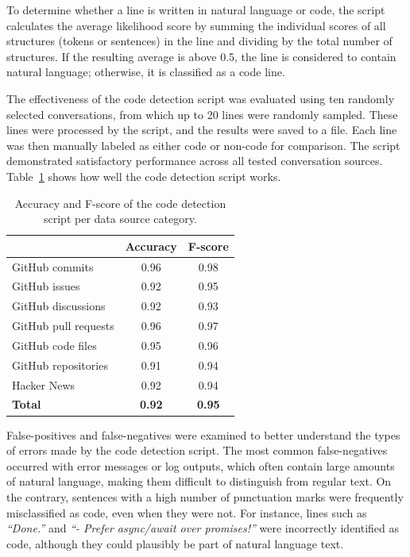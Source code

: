 To determine whether a line is written in natural language or code, the script calculates the average likelihood score by summing the individual scores of all structures (tokens or sentences) in the line and dividing by the total number of structures. If the resulting average is above 0.5, the line is considered to contain natural language; otherwise, it is classified as a code line.

The effectiveness of the code detection script was evaluated using ten randomly selected conversations, from which up to 20 lines were randomly sampled. These lines were processed by the script, and the results were saved to a file. Each line was then manually labeled as either code or non-code for comparison. The script demonstrated satisfactory performance across all tested conversation sources. Table~\ref{table:script-accuracy} shows how well the code detection script works.

\begin{table}[h]
    \centering
    \begin{tabular}{|l|c|c|}
        \hline
        & Accuracy & F-score  \\
        \hline
        GitHub commits & 0.96 & 0.98 \\
        \hline
        GitHub issues & 0.92 & 0.95 \\
        \hline
        GitHub discussions & 0.92 & 0.93 \\
        \hline
        GitHub pull requests & 0.96 & 0.97  \\
        \hline
        GitHub code files & 0.95 & 0.96  \\
        \hline
        GitHub repositories & 0.91 & 0.94  \\
        \hline
        Hacker News & 0.92 & 0.94  \\
        \hline
        \textbf{Total} & \textbf{0.92} & \textbf{0.95}  \\
        \hline
    \end{tabular}
    \caption{Accuracy and F-score of the code detection script per data source category.}
    \label{table:script-accuracy}
\end{table}

False-positives and false-negatives were examined to better understand the types of errors made by the code detection script. The most common false-negatives occurred with error messages or log outputs, which often contain large amounts of natural language, making them difficult to distinguish from regular text. On the contrary, sentences with a high number of punctuation marks were frequently misclassified as code, even when they were not. For instance, lines such as \textit{``Done.''} and \textit{``- Prefer async/await over promises!''} were incorrectly identified as code, although they could plausibly be part of natural language text.

